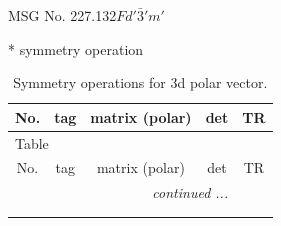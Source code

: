 \documentclass[fleqn,8pt]{jsarticle}
\begin{document}
\setcounter{MaxMatrixCols}{32}

\renewcommand{\tablename}{Table~}
\renewcommand{\figurename}{Figure~}
\begin{center}
\LARGE
MSG No. 227.132\quad$Fd'\bar{3}'m'$
\end{center}
* symmetry operation
\renewcommand{\arraystretch}{1.3}
\begin{longtable}{ccccc}
\caption{Symmetry operations for 3d polar vector.}
 \\
 \hline \hline
No. & tag & matrix (polar) & det & TR \\ \hline \endfirsthead

\multicolumn{4}{l}{\tablename\ \thetable{}} \\
 \hline \hline
No. & tag & matrix (polar) & det & TR \\ \hline \endhead

 \hline \hline
\multicolumn{4}{r}{\footnotesize\it continued ...} \\ \endfoot

 \hline \hline
\multicolumn{4}{r}{} \\ \endlastfoot


\end{longtable}
\end{document}
